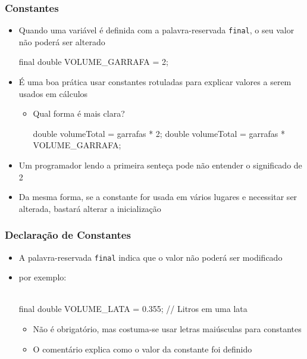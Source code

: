 \documentclass[xcolor={dvipsnames,table},aspectratio=169]{beamer}
\begin{document}
\begin{frame}[fragile]\frametitle{Constantes}
\begin{itemize}
	\item Quando uma variável é definida com a palavra-reservada \texttt{final}, o seu valor não poderá ser alterado
\begin{javacode}
final double VOLUME_GARRAFA = 2;
\end{javacode}
	\item É uma boa prática usar constantes rotuladas para explicar valores a serem usados em cálculos
	\begin{itemize}
		\item Qual forma é mais clara?
\begin{javacode}
double volumeTotal = garrafas * 2;
double volumeTotal = garrafas * VOLUME_GARRAFA;
\end{javacode}
	\end{itemize}
	\item Um programador lendo a primeira senteça pode não entender o significado de 2
	\item Da mesma forma, se a constante for usada em vários lugares e necessitar ser alterada, bastará alterar a inicialização
\end{itemize}
\end{frame}

\begin{frame}[fragile]\frametitle{Declaração de Constantes}
\begin{itemize}
	\item A palavra-reservada \texttt{final} indica que o valor não poderá ser modificado
	\item por exemplo:\\~\\
\begin{javacode}
final double VOLUME_LATA = 0.355; // Litros em uma lata
\end{javacode}
	\begin{itemize}
		\item Não é obrigatório, mas costuma-se usar letras maiúsculas para constantes
		\item O comentário explica como o valor da constante foi definido
	\end{itemize}
\end{itemize}
\end{frame}
\end{document}
